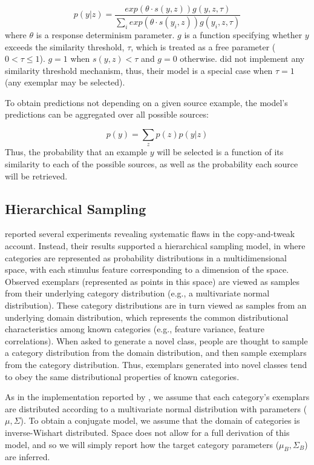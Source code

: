 \documentclass[10pt,letterpaper]{article}
\begin{document}
\begin{equation}
    p(y|z)  = \dfrac
    { exp(\theta \cdot s(y,z)) g(y,z,\tau)}
    {\sum_i{exp(\theta \cdot s(y_i,z)) g(y_i,z,\tau)}} 
\end{equation}
% 
where $\theta$ is a response determinism parameter. $g$ is a function specifying whether $y$ exceeds the similarity threshold, $\tau$, which is treated as a free parameter ($0<\tau\leq1$). $g = 1$ when $s(y,z) < \tau$ and $g = 0$ otherwise. \citet{jern2013probabilistic} did not implement any similarity threshold mechanism, thus, their model is a special case when $\tau = 1$ (any exemplar may be selected).

To obtain predictions not depending on a given source example, the model's predictions can be aggregated over all possible sources:

\begin{equation}
  p(y) = \sum_z{p(z)p(y|z) }
\end{equation}
% 
Thus, the probability that an example $y$ will be selected is a function of its similarity to each of the possible sources, as well as the probability each source will be retrieved.


\subsection{Hierarchical Sampling}

\citet{jern2013probabilistic} reported several experiments revealing systematic flaws in the copy-and-tweak account. Instead, their results supported a hierarchical sampling model, in where categories are represented as probability distributions in a multidimensional space, with each stimulus feature corresponding to a dimension of the space. Observed exemplars (represented as points in this space) are viewed as samples from their underlying category distribution (e.g., a multivariate normal distribution). These category distributions are in turn viewed as samples from an underlying domain distribution, which represents the common distributional characteristics among known categories (e.g., feature variance, feature correlations). When asked to generate a novel class, people are thought to sample a category distribution from the domain distribution, and then sample exemplars from the category distribution. Thus, exemplars generated into novel classes tend to obey the same distributional properties of known categories. 

As in the implementation reported by \cite{jern2013probabilistic}, we assume that each category's exemplars are distributed according to a multivariate normal distribution with parameters ($\mu, \Sigma$). To obtain a conjugate model, we assume that the domain of categories is inverse-Wishart distributed. Space does not allow for a full derivation of this model, and so we will simply report how the target category parameters ($\mu_B, \Sigma_B$) are inferred.
\end{document}
